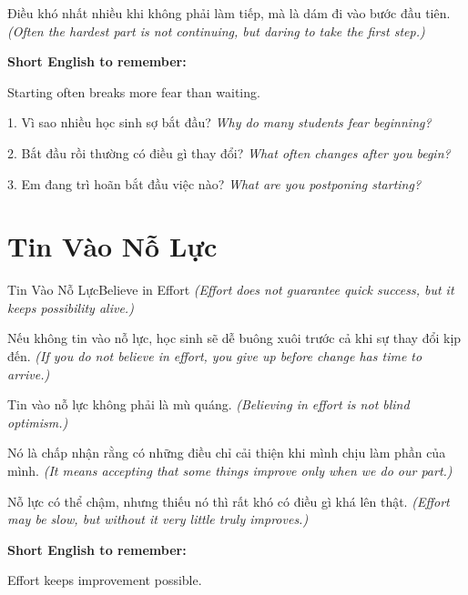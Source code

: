 \begin{baihoc}
Điều khó nhất nhiều khi không phải làm tiếp, mà là dám đi vào bước đầu tiên.
\textit{(Often the hardest part is not continuing, but daring to take the first step.)}
\end{baihoc}

\begin{ghinhoanh}
\textbf{Short English to remember:}

Starting often breaks more fear than waiting.

\end{ghinhoanh}

\begin{tuhocnhanh}
1. Vì sao nhiều học sinh sợ bắt đầu? \textit{Why do many students fear beginning?}

2. Bắt đầu rồi thường có điều gì thay đổi? \textit{What often changes after you begin?}

3. Em đang trì hoãn bắt đầu việc nào? \textit{What are you postponing starting?}
\end{tuhocnhanh}
\ngancach

\section{Tin Vào Nỗ Lực}
\begin{truyen}{Tin Vào Nỗ Lực}{Believe in Effort}
\textit{(Effort does not guarantee quick success, but it keeps possibility alive.)}

Nếu không tin vào nỗ lực, học sinh sẽ dễ buông xuôi trước cả khi sự thay đổi kịp đến.
\textit{(If you do not believe in effort, you give up before change has time to arrive.)}

Tin vào nỗ lực không phải là mù quáng.
\textit{(Believing in effort is not blind optimism.)}

Nó là chấp nhận rằng có những điều chỉ cải thiện khi mình chịu làm phần của mình.
\textit{(It means accepting that some things improve only when we do our part.)}
\end{truyen}

\begin{baihoc}
Nỗ lực có thể chậm, nhưng thiếu nó thì rất khó có điều gì khá lên thật.
\textit{(Effort may be slow, but without it very little truly improves.)}
\end{baihoc}

\begin{ghinhoanh}
\textbf{Short English to remember:}

Effort keeps improvement possible.

\end{ghinhoanh}

